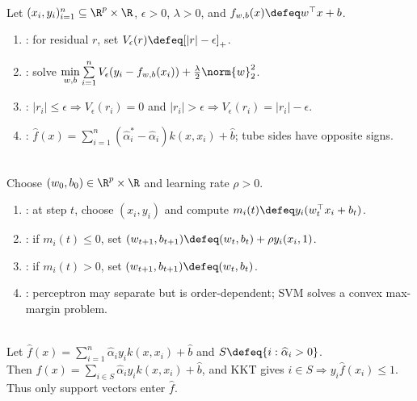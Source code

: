 \begin{method} \label{meth:sl-epsilon-insensitive-support-vector-regression} \\
Let $(x_i,y_i)_{i=1}^n\subseteq\R^p\times\R$, $\epsilon>0$, $\lambda>0$, and $f_{w,b}(x)\defeq w^\top x+b$.
\begin{enumerate}[label=(\roman*)]
\setlength{\itemsep}{0pt}
\item {}: for residual $r$, set $V_\epsilon(r)\defeq[|r|-\epsilon]_+$.
\item {}: solve $\min\limits_{w,b}\sum\limits_{i=1}^n V_\epsilon(y_i-f_{w,b}(x_i))+\frac{\lambda}{2}\norm{w}_2^2$.
\item {}: $|r_i|\leq\epsilon\Rightarrow V_\epsilon(r_i)=0$ and $|r_i|>\epsilon\Rightarrow V_\epsilon(r_i)=|r_i|-\epsilon$.
\item {}: $\widehat{f}(x)=\sum\limits_{i=1}^n(\widehat{\alpha}_i^*-\widehat{\alpha}_i)k(x,x_i)+\widehat{b}$; tube sides have opposite signs.
\end{enumerate}
\end{method}

\begin{method} \label{meth:sl-perceptron-update} \\
Choose $(w_0,b_0)\in\R^p\times\R$ and learning rate $\rho>0$.
\begin{enumerate}[label=(\roman*)]
\setlength{\itemsep}{0pt}
\item {}: at step $t$, choose $(x_i,y_i)$ and compute $m_i(t)\defeq y_i(w_t^\top x_i+b_t)$.
\item {}: if $m_i(t)\leq0$, set $(w_{t+1},b_{t+1})\defeq(w_t,b_t)+\rho y_i(x_i,1)$.
\item {}: if $m_i(t)>0$, set $(w_{t+1},b_{t+1})\defeq(w_t,b_t)$.
\item {}: perceptron may separate but is order-dependent; SVM solves a convex max-margin problem.
\end{enumerate}
\end{method}

\begin{remark} \label{rem:sl-support-vectors} \\
Let $\widehat{f}(x)=\sum\limits_{i=1}^n\widehat{\alpha}_iy_ik(x,x_i)+\widehat{b}$ and $S\defeq\{i:\widehat{\alpha}_i>0\}$.\\
Then $\widehat{f}(x)=\sum\limits_{i\in S}\widehat{\alpha}_iy_ik(x,x_i)+\widehat{b}$, and KKT gives $i\in S\Rightarrow y_i\widehat{f}(x_i)\leq1$. Thus only support vectors enter $\widehat{f}$.
\end{remark}

